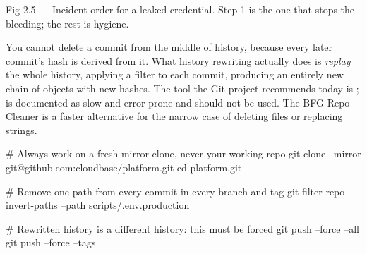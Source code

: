 \begin{wbfigure}{Fig 2.5 — Incident order for a leaked credential. Step 1 is the one that stops the bleeding; the rest is hygiene.}
\end{wbfigure}

 You cannot delete a commit from the middle of history, because every later commit's hash is derived from it. What history rewriting actually does is \emph{replay} the whole history, applying a filter to each commit, producing an entirely new chain of objects with new hashes. The tool the Git project recommends today is ;  is documented as slow and error-prone and should not be used. The BFG Repo-Cleaner is a faster alternative for the narrow case of deleting files or replacing strings.

\begin{bashbox}
# Always work on a fresh mirror clone, never your working repo
git clone --mirror git@github.com:cloudbase/platform.git
cd platform.git

# Remove one path from every commit in every branch and tag
git filter-repo --invert-paths --path scripts/.env.production

# Rewritten history is a different history: this must be forced
git push --force --all
git push --force --tags
\end{bashbox}

